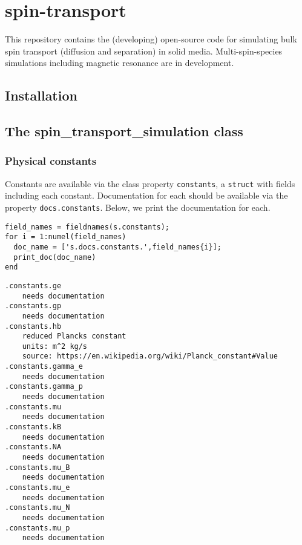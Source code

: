 \hypertarget{spin-transport}{%
\section{spin-transport}\label{spin-transport}}

This repository contains the (developing) open-source code for
simulating bulk spin transport (diffusion and separation) in solid
media. Multi-spin-species simulations including magnetic resonance are
in development.

\hypertarget{installation}{%
\subsection{Installation}\label{installation}}

\hypertarget{the-spin_transport_simulation-class}{%
\subsection{The spin\_transport\_simulation
class}\label{the-spin_transport_simulation-class}}

\hypertarget{physical-constants}{%
\subsubsection{Physical constants}\label{physical-constants}}

Constants are available via the class property
\texttt{constants}, a \texttt{struct} with
fields including each constant. Documentation for each should be
available via the property \texttt{docs.constants}. Below,
we print the documentation for each.

\begin{verbatim}
field_names = fieldnames(s.constants);
for i = 1:numel(field_names)
  doc_name = ['s.docs.constants.',field_names{i}];
  print_doc(doc_name)
end
\end{verbatim}

\begin{verbatim}
.constants.ge
    needs documentation
.constants.gp
    needs documentation
.constants.hb
    reduced Plancks constant
    units: m^2 kg/s
    source: https://en.wikipedia.org/wiki/Planck_constant#Value
.constants.gamma_e
    needs documentation
.constants.gamma_p
    needs documentation
.constants.mu
    needs documentation
.constants.kB
    needs documentation
.constants.NA
    needs documentation
.constants.mu_B
    needs documentation
.constants.mu_e
    needs documentation
.constants.mu_N
    needs documentation
.constants.mu_p
    needs documentation
\end{verbatim}

